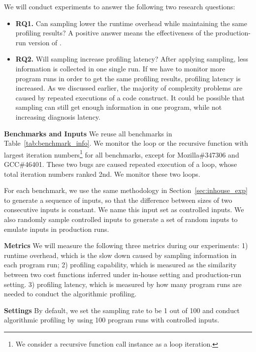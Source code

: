 We will conduct experiments to answer the following two research questions:

\begin{itemize}
\item {\bf RQ1.} 
Can sampling lower the runtime overhead while maintaining the same profiling results? 
A positive answer means the effectiveness of the production-run version of \Tool. 

\item {\bf RQ2.} 
Will sampling increase profiling latency? 
After applying sampling, less information is collected in one single run. 
If we have to monitor more program runs in order to get the same profiling results,
profiling latency is increased.
As we discussed earlier, the majority of complexity problems are caused 
by repeated executions of a code construct. 
It could be possible that sampling can still get enough information in one program, 
while not increasing diagnosis latency. 

\end{itemize}

\noindent\textbf{Benchmarks and Inputs}
We reuse all benchmarks in Table~\ref{tab:benchmark_info}.
We monitor the loop or the recursive function with largest iteration 
numbers\footnote{We consider a recursive function call instance as a loop iteration.} 
for all benchmarks,
except for Mozilla\#347306 and GCC\#46401. 
These two bugs are caused repeated execution of a loop, 
whose total iteration numbers ranked 2nd. 
We monitor these two loops.

For each benchmark, 
we use the same methodology in Section~\ref{sec:inhouse_exp} 
to generate a sequence of inputs, 
so that the difference between sizes of two consecutive inputs is constant.
We name this input set as controlled inputs.
We also randomly sample controlled inputs to generate a set of random 
inputs to emulate inputs in production runs.    

\noindent\textbf{Metrics}
We will measure the following three metrics during our experiments:
1) runtime overhead, which is the slow down caused 
by sampling information in each program run;
2) profiling capability, which is measured as the similarity between two cost functions 
inferred under in-house setting and production-run setting. 
3) profiling latency, which is measured by how many program 
runs are needed to conduct the algorithmic profiling. 




\noindent\textbf{Settings}
By default, we set the sampling rate to be 1 out of 100 
and conduct algorithmic profiling by using 100 program runs with controlled inputs.  


